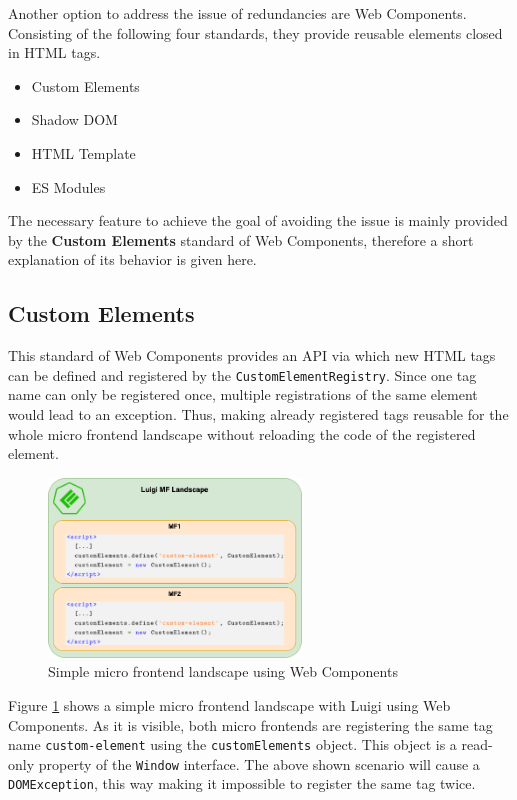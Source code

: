 Another option to address the issue of redundancies are Web Components. Consisting of the following four standards, they provide reusable elements closed in HTML tags.\cite{mdn_web_docs}

\begin{itemize}[noitemsep]
	\item Custom Elements
	\item Shadow DOM
	\item HTML Template
	\item ES Modules
\end{itemize}


The necessary feature to achieve the goal of avoiding the issue is mainly provided by the \textbf{Custom Elements} standard of Web Components, therefore a short explanation of its behavior is given here.

\subsection{Custom Elements}

This standard of Web Components provides an API via which new HTML tags can be defined and registered by the \texttt{CustomElementRegistry}. Since one tag name can only be registered once, multiple registrations of the same element would lead to an exception. Thus, making already registered tags reusable for the whole micro frontend landscape without reloading the code of the registered element.\cite{google_reusable_wcs}

\begin{figure}[!h]
	\centering
	\includegraphics[width=0.6\textwidth]{Figures/customElements_registered.drawio.png}
	\caption{Simple micro frontend landscape using Web Components}
	\label{fig:same_wc_example}
\end{figure}

Figure \ref{fig:same_wc_example} shows a simple micro frontend landscape with Luigi using Web Components. As it is visible, both micro frontends are registering the same tag name \texttt{custom-element} using the \texttt{customElements} object. This object is a read-only property of the \texttt{Window} interface.
The above shown scenario will cause a  \texttt{DOMException}, this way making it impossible to register the same tag twice.

